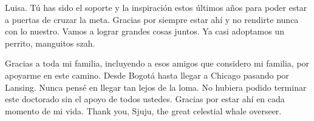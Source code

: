 \documentclass[]{msu-thesis}
\begin{document}
Luisa. Tú has sido el soporte y la inspiración estos últimos años para poder estar a puertas de cruzar la meta. Gracias por siempre estar ahí y no rendirte nunca con lo nuestro. Vamos a lograr grandes cosas juntos. Ya casi adoptamos un perrito, manguitos szah.

Gracias a toda mi familia, incluyendo a esos amigos que considero mi familia, por apoyarme en este camino. Desde Bogotá hasta llegar a Chicago pasando por Lansing. Nunca pensé en llegar tan lejos de la loma. No hubiera podido terminar este doctorado sin el apoyo de todos ustedes. Gracias por estar ahí en cada momento de mi vida. Thank you, Sjuju, the great celestial whale overseer.

%
\clearpage
\SingleSpacing
\tableofcontents %
%
\clearpage
\listofabbreviations 

%
%
\mainmatter
%
\end{document}

